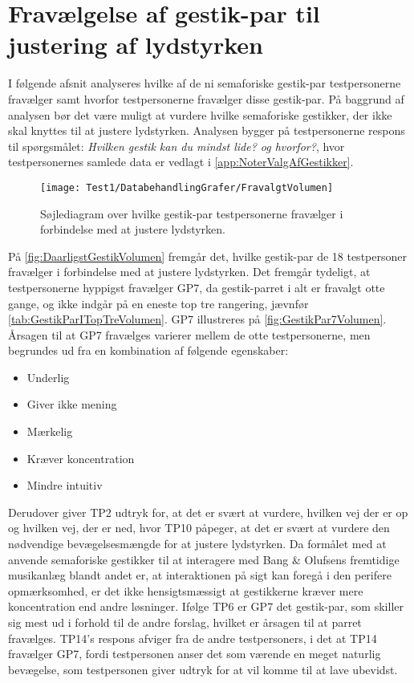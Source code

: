 \section{Fravælgelse af gestik-par til justering af lydstyrken}
\label{app:TestresultaterVolumenDaarlig}
%
I følgende afsnit analyseres hvilke af de ni semaforiske gestik-par testpersonerne fravælger samt hvorfor testpersonerne fravælger disse gestik-par. På baggrund af analysen bør det være muligt at vurdere hvilke semaforiske gestikker, der ikke skal knyttes til at justere lydstyrken. Analysen bygger på testpersonerne respons til spørgsmålet: \textit{Hvilken gestik kan du mindst lide? og hvorfor?}, hvor testpersonernes samlede data er vedlagt i \autoref{app:NoterValgAfGestikker}.
%
\begin{figure}[H]
	\centering
	\texttt{[image: Test1/DatabehandlingGrafer/FravalgtVolumen]}
	\caption{Søjlediagram over hvilke gestik-par testpersonerne fravælger i forbindelse med at justere lydstyrken.}
	\label{fig:DaarligstGestikVolumen}
\end{figure}
\noindent
%
På \autoref{fig:DaarligstGestikVolumen} fremgår det, hvilke gestik-par de 18 testpersoner fravælger i forbindelse med at justere lydstyrken. Det fremgår tydeligt, at testpersonerne hyppigst fravælger GP7, da gestik-parret i alt er fravalgt otte gange, og ikke indgår på en eneste top tre rangering, jævnfør \autoref{tab:GestikParITopTreVolumen}. GP7 illustreres på \autoref{fig:GestikPar7Volumen}. Årsagen til at GP7 fravælges varierer mellem de otte testpersonerne, men begrundes ud fra en kombination af følgende egenskaber:
%
\begin{multicols}{3}
    \begin{itemize}
        \item Underlig
        \item Giver ikke mening
        \item Mærkelig
        \item Kræver koncentration
        \item Mindre intuitiv
\end{itemize}
\end{multicols}
\noindent
% 
Derudover giver TP2 udtryk for, at det er svært at vurdere, hvilken vej der er op og hvilken vej, der er ned, hvor TP10 påpeger, at det er svært at vurdere den nødvendige bevægelsesmængde for at justere lydstyrken. Da formålet med at anvende semaforiske gestikker til at interagere med Bang $\&$ Olufsens fremtidige musikanlæg blandt andet er, at interaktionen på sigt kan foregå i den perifere opmærksomhed, er det ikke hensigtsmæssigt at gestikkerne kræver mere koncentration end andre løsninger. Ifølge TP6 er GP7 det gestik-par, som skiller sig mest ud i forhold til de andre forslag, hvilket er årsagen til at parret fravælges. TP14's respons afviger fra de andre testpersoners, i det at TP14 fravælger GP7, fordi testpersonen anser det som værende en meget naturlig bevægelse, som testpersonen giver udtryk for at vil komme til at lave ubevidst.

